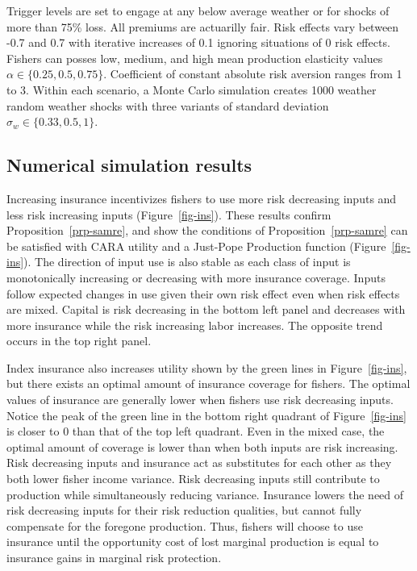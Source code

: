 \documentclass[
  letterpaper,
  DIV=11,
  numbers=noendperiod]{scrartcl}
\theoremstyle{plain}
\theoremstyle{plain}
\theoremstyle{remark}
\begin{document}
Trigger levels are set to engage at any below average weather or for
shocks of more than 75\% loss. All premiums are actuarilly fair. Risk
effects vary between -0.7 and 0.7 with iterative increases of 0.1
ignoring situations of 0 risk effects. Fishers can posses low, medium,
and high mean production elasticity values
\(\alpha\in\{0.25,0.5,0.75\}\). Coefficient of constant absolute risk
aversion ranges from 1 to 3. Within each scenario, a Monte Carlo
simulation creates 1000 weather random weather shocks with three
variants of standard deviation \(\sigma_w\in\{0.33,0.5,1\}\).

\hypertarget{sec-simres}{%
\subsection{Numerical simulation results}\label{sec-simres}}

Increasing insurance incentivizes fishers to use more risk decreasing
inputs and less risk increasing inputs (Figure~\ref{fig-ins}). These
results confirm Proposition~\ref{prp-samre}, and show the conditions of
Proposition~\ref{prp-samre} can be satisfied with CARA utility and a
Just-Pope Production function (Figure~\ref{fig-ins}). The direction of
input use is also stable as each class of input is monotonically
increasing or decreasing with more insurance coverage. Inputs follow
expected changes in use given their own risk effect even when risk
effects are mixed. Capital is risk decreasing in the bottom left panel
and decreases with more insurance while the risk increasing labor
increases. The opposite trend occurs in the top right panel.

Index insurance also increases utility shown by the green lines in
Figure~\ref{fig-ins}, but there exists an optimal amount of insurance
coverage for fishers. The optimal values of insurance are generally
lower when fishers use risk decreasing inputs. Notice the peak of the
green line in the bottom right quadrant of Figure~\ref{fig-ins} is
closer to 0 than that of the top left quadrant. Even in the mixed case,
the optimal amount of coverage is lower than when both inputs are risk
increasing. Risk decreasing inputs and insurance act as substitutes for
each other as they both lower fisher income variance. Risk decreasing
inputs still contribute to production while simultaneously reducing
variance. Insurance lowers the need of risk decreasing inputs for their
risk reduction qualities, but cannot fully compensate for the foregone
production. Thus, fishers will choose to use insurance until the
opportunity cost of lost marginal production is equal to insurance gains
in marginal risk protection.
\end{document}
